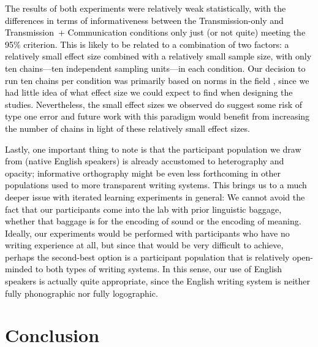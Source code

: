 \documentclass[doc,biblatex]{apa7}
\newcommand\newmaterial[1]{\textcolor{black}{#1}}
\newcommand\secondrevision[1]{\textcolor{black}{#1}}
\begin{document}
\newmaterial{The results of both experiments were relatively weak statistically, with the differences in terms of informativeness between the Transmission-only and Transmission~+ Communication conditions only just (or not quite) meeting the 95\% criterion. This is likely to be related to a combination of two factors: a relatively small effect size combined with a relatively small sample size, with only ten chains---ten independent sampling units---in each condition. \secondrevision{Our decision to run ten chains per condition was primarily based on norms in the field \parencite[e.g.,][]{Kempe:2015, Kirby:2008, Kirby:2015, Raviv:2018, Roberts:2018, Smith:2010, Tamariz:2015}, since we had little idea of what effect size we could expect to find when designing the studies. Nevertheless, the small effect sizes we observed do suggest some risk of type one error and future work with this paradigm would benefit from increasing the number of chains in light of these relatively small effect sizes}.}

\newmaterial{Lastly, one important thing to note is that the participant population we draw from (native English speakers) is already accustomed to heterography and opacity; informative orthography might be even less forthcoming in other populations used to more transparent writing systems. This brings us to a much deeper issue with iterated learning experiments in general: We cannot avoid the fact that our participants come into the lab with prior linguistic baggage, whether that baggage is for the encoding of sound or the encoding of meaning. Ideally, our experiments would be performed with participants who have no writing experience at all, but since that would be very difficult to achieve, perhaps the second-best option is a participant population that is relatively open-minded to both types of writing systems. In this sense, our use of English speakers is actually quite appropriate, since the English writing system is neither fully phonographic nor fully logographic.}

\section{Conclusion}
\end{document}
